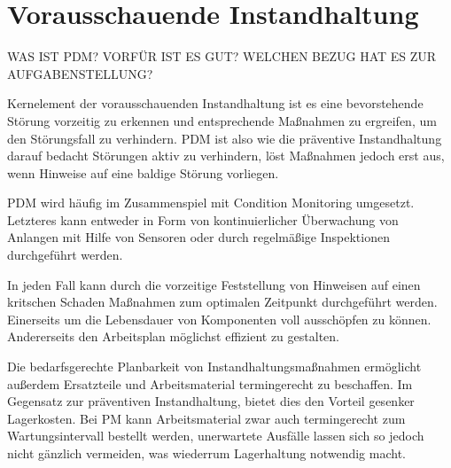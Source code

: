 \chapter{Vorausschauende Instandhaltung}
\label{ch:vorausschauende instandhaltung}
WAS IST PDM? VORFÜR IST ES GUT? WELCHEN BEZUG HAT ES ZUR AUFGABENSTELLUNG?

Kernelement der vorausschauenden Instandhaltung ist es eine bevorstehende Störung vorzeitig zu erkennen und entsprechende Maßnahmen zu ergreifen, um den Störungsfall zu verhindern. PDM ist also wie die präventive Instandhaltung darauf bedacht Störungen aktiv zu verhindern, löst Maßnahmen jedoch erst aus, wenn Hinweise auf eine baldige Störung vorliegen.

PDM wird häufig im Zusammenspiel mit Condition Monitoring umgesetzt. Letzteres kann entweder in Form von kontinuierlicher Überwachung von Anlangen mit Hilfe von Sensoren oder durch regelmäßige Inspektionen durchgeführt werden.

In jeden Fall kann durch die vorzeitige Feststellung von Hinweisen auf einen kritschen Schaden Maßnahmen zum optimalen Zeitpunkt durchgeführt werden. Einerseits um die Lebensdauer von Komponenten voll ausschöpfen zu können. Andererseits den Arbeitsplan möglichst effizient zu gestalten.

Die bedarfsgerechte Planbarkeit von Instandhaltungsmaßnahmen ermöglicht außerdem Ersatzteile und Arbeitsmaterial termingerecht zu beschaffen. Im Gegensatz zur präventiven Instandhaltung, bietet dies den Vorteil gesenker Lagerkosten. Bei PM kann Arbeitsmaterial zwar auch termingerecht zum Wartungsintervall bestellt werden, unerwartete Ausfälle lassen sich so jedoch nicht gänzlich vermeiden, was wiederrum Lagerhaltung notwendig macht. 

